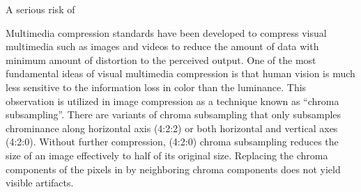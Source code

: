 A serious risk of 


Multimedia compression standards have been developed to compress visual multimedia such as images and videos to reduce the amount of data with minimum amount of distortion to the perceived output. One of the most fundamental ideas of visual multimedia compression is that human vision is much less sensitive to the information loss in color than the luminance.
This observation is utilized in image compression as a technique known as ``chroma subsampling''. There are variants of chroma subsampling that only subsamples chrominance along horizontal axis (4:2:2) or both horizontal and vertical axes (4:2:0). Without further compression, (4:2:0) chroma subsampling reduces the size of an image effectively to half of its original size. Replacing the chroma components of the pixels in by neighboring chroma components does not yield visible artifacts.
